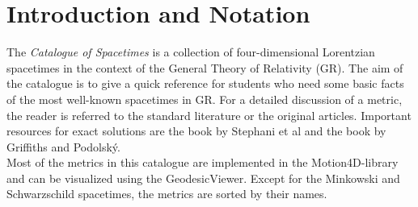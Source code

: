 \documentclass[10pt,twoside,notitlepage,a4paper,fleqn,openbib]{report}
\newcommand{\clearemptydoublepage}{\newpage{\pagestyle{empty}\cleardoublepage}}
\begin{document}
\clearemptydoublepage
\tableofcontents

\clearemptydoublepage
\setcounter{page}{1}
\chapter{Introduction and Notation}
The {\sl Catalogue of Spacetimes} is a collection of four-dimensional Lorentzian spacetimes in the context of the General Theory of Relativity (GR). The aim of the catalogue is to give a quick reference for students who need some basic facts of the most well-known spacetimes in GR. For a detailed discussion of a metric, the reader is referred to the standard literature or the original articles. Important resources for exact solutions are the book by Stephani et al\cite{exact2003} and the book by Griffiths and Podolsk{\'y}\cite{griffiths2009}.\\[0.5em]
Most of the metrics in this catalogue are implemented in the Motion4D-library\cite{mueller2009b} and can be visualized using the GeodesicViewer\cite{mueller2010a}. Except for the Minkowski and Schwarzschild spacetimes, the metrics are sorted by their names.

\end{document}
